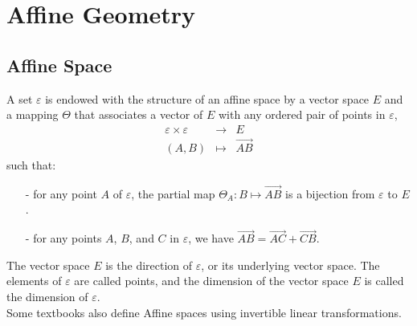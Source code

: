 \chapter{Affine Geometry}

\section{Affine Space}

A set $\varepsilon$ is endowed with the structure of an affine space by a vector space $E$
and a mapping $\Theta$ that associates a vector of $E$ with any ordered pair of points in $\varepsilon$,
\begin{eqnarray*}
  \varepsilon \times \varepsilon &\longrightarrow & E \\
  (A,B) &\longmapsto & \overrightarrow{AB}
\end{eqnarray*}
such that:
\begin{itemize}
  \item[-]{for any point $A$ of $\varepsilon$, the partial map $\Theta_A : B \mapsto \overrightarrow{AB}$
    is a bijection from $\varepsilon$ to $E$.}
    \item[-]{for any points $A$, $B$, and $C$ in $\varepsilon$, we have $\overrightarrow{AB}=
      \overrightarrow{AC}+\overrightarrow{CB}$.}
\end{itemize}
The vector space $E$ is the direction of $\varepsilon$, or its underlying vector space.
The elements of $\varepsilon$ are called points, and the dimension of the vector space $E$
is called the dimension of $\varepsilon$.\\
Some textbooks also define Affine spaces using invertible linear transformations.

